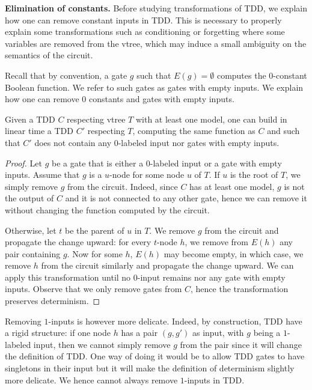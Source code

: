 \documentclass[a4paper,UKenglish,cleveref, autoref, thm-restate]{lipics-v2021}
\begin{document}
\begin{toappendix}

\textbf{Elimination of constants.} Before studying transformations of TDD, we explain how one can remove constant inputs in TDD. This is necessary to properly explain some transformations such as conditioning or forgetting where some variables are removed from the vtree, which may induce a small ambiguity on the semantics of the circuit. 

Recall that by convention, a gate $g$ such that $E(g)=\emptyset$ computes the $0$-constant Boolean function. We refer to such gates as gates with empty inputs. We explain how one can remove $0$ constants and gates with empty inputs.

\begin{theorem}
  \label{thm:prop:zero-elim} Given a TDD $C$ respecting vtree $T$ with at least one model, one can build in linear time a TDD $C'$ respecting $T$, computing the same function as $C$ and such that $C'$ does not contain any $0$-labeled input nor gates with empty inputs. 
\end{theorem}
\begin{proof}
  Let $g$ be a gate that is either a $0$-labeled input or a gate with empty inputs. Assume that $g$ is a $u$-node for some node $u$ of $T$. If $u$ is the root of $T$, we simply remove $g$ from the circuit. Indeed, since $C$ has at least one model, $g$ is not the output of $C$ and it is not connected to any other gate, hence we can remove it without changing the function computed by the circuit.

  Otherwise, let $t$ be the parent of $u$ in $T$. We remove $g$ from the circuit and propagate the change upward: for every $t$-node $h$, we remove from $E(h)$ any pair containing $g$. Now for some $h$, $E(h)$ may become empty, in which case, we remove $h$ from the circuit similarly and propagate the change upward. We can apply this transformation until no $0$-input remains nor any gate with empty inputs. Observe that we only remove gates from $C$, hence the transformation preserves determinism.
\end{proof}

Removing $1$-inputs is however more delicate. Indeed, by construction, TDD have a rigid structure: if one node $h$ has a pair $(g,g')$ as input, with $g$ being a $1$-labeled input, then we cannot simply remove $g$ from the pair since it will change the definition of TDD. One way of doing it would be to allow TDD gates to have singletons in their input but it will make the definition of determinism slightly more delicate. We hence cannot always remove $1$-inputs in TDD.


\end{toappendix}
\end{document}

